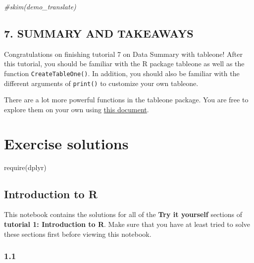 \documentclass[
]{book}
\newenvironment{Shaded}{\begin{snugshade}}{\end{snugshade}}
\newcommand{\CommentTok}[1]{\textcolor[rgb]{0.56,0.35,0.01}{\textit{#1}}}
\newcommand{\FunctionTok}[1]{\textcolor[rgb]{0.00,0.00,0.00}{#1}}
\newcommand{\NormalTok}[1]{#1}
\begin{document}
\begin{Shaded}
\begin{Highlighting}[]
\CommentTok{\#skim(demo\_translate)}
\end{Highlighting}
\end{Shaded}

\hypertarget{summary-and-takeaways-2}{%
\section{7. SUMMARY AND TAKEAWAYS}\label{summary-and-takeaways-2}}

Congratulations on finishing tutorial 7 on Data Summary with tableone! After this tutorial, you should be familiar with the R package tableone as well as the function \texttt{CreateTableOne()}. In addition, you should also be familiar with the different arguments of \texttt{print()} to customize your own tableone.

There are a lot more powerful functions in the tableone package. You are free to explore them on your own using \href{https://cran.r-project.org/web/packages/tableone/vignettes/introduction.htmlhttps://cran.r-project.org/web/packages/tableone/vignettes/introduction.html}{this document}.

\hypertarget{exercise-solutions}{%
\chapter{Exercise solutions}\label{exercise-solutions}}

\begin{Shaded}
\begin{Highlighting}[]
\FunctionTok{require}\NormalTok{(dplyr)}
\end{Highlighting}
\end{Shaded}

\hypertarget{introduction-to-r-1}{%
\section{Introduction to R}\label{introduction-to-r-1}}

This notebook contains the solutions for all of the \textbf{Try it yourself} sections of \textbf{tutorial 1: Introduction to R}. Make sure that you have at least tried to solve these sections first before viewing this notebook.

\hypertarget{section}{%
\subsection{1.1}\label{section}}
\end{document}
